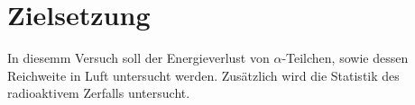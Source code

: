\section{Zielsetzung}

\label{sec:Zielsetzung}

In diesemm Versuch soll der Energieverlust von $\alpha$-Teilchen, sowie dessen Reichweite in Luft untersucht werden. Zusätzlich
wird die Statistik des radioaktivem Zerfalls untersucht.
